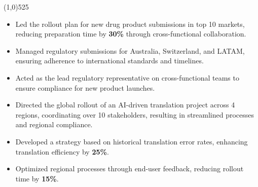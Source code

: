\documentclass[a4paper]{deedy-resume} %
\begin{document}
\begin{center}
    \vspace{-17pt}
    \line(1,0){525}
    \vspace{-11pt}
\end{center}
    \vspace{-10pt}
    \begin{multicols}{2}
        \begin{itemize}
            \item Led the rollout plan for new drug product submissions in top 10 markets, reducing preparation time by \textbf{30\%} through cross-functional collaboration.
            \item Managed regulatory submissions for Australia, Switzerland, and LATAM, ensuring adherence to international standards and timelines.
            \item Acted as the lead regulatory representative on cross-functional teams to ensure compliance for new product launches.
        \end{itemize}
    \end{multicols}    
\vspace{-10pt}
    \vspace{-10pt}
    \begin{multicols}{2}
        \begin{itemize}
            \item Directed the global rollout of an AI-driven translation project across 4 regions, coordinating over 10 stakeholders, resulting in streamlined processes and regional compliance.
            \item Developed a strategy based on historical translation error rates, enhancing translation efficiency by \textbf{25\%}.
            \item Optimized regional processes through end-user feedback, reducing rollout time by \textbf{15\%}.
        \end{itemize}
    \end{multicols}
\vspace{-10pt}
        \vspace{-10pt}
\end{document}
